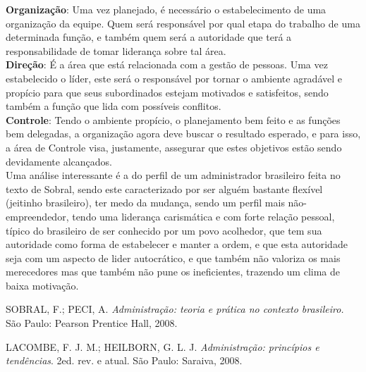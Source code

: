 \documentclass[14pt, oneside]{article}
\newcommand\tab[1][1cm]{\hspace*{#1}}
\theoremstyle{definition}
\begin{document}
                \tab \textbf{Organização}: Uma vez planejado, é necessário o estabelecimento de uma organização da equipe. Quem será responsável por qual etapa do trabalho de uma determinada função, e também quem será a autoridade que terá a responsabilidade de tomar liderança sobre tal área. \\
                \tab \textbf{Direção}: É a área que está relacionada com a gestão de pessoas. Uma vez estabelecido o líder, este será o responsável por tornar o ambiente agradável e propício para que seus subordinados estejam motivados e satisfeitos, sendo também a função que lida com possíveis conflitos. \\
                \tab \textbf{Controle}: Tendo o ambiente propício, o planejamento bem feito e as funções bem delegadas, a organização agora deve buscar o resultado esperado, e para isso, a área de Controle visa, justamente, assegurar que estes objetivos estão sendo devidamente alcançados. \\
                \tab Uma análise interessante é a do perfil de um administrador brasileiro feita no texto de Sobral, sendo este caracterizado por ser alguém bastante flexível (jeitinho brasileiro), ter medo da mudança, sendo um perfil mais não-empreendedor, tendo uma liderança carismática e com forte relação pessoal, típico do brasileiro de ser conhecido por um povo acolhedor, que tem sua autoridade como forma de estabelecer e manter a ordem, e que esta autoridade seja com um aspecto de lider autocrático, e que também não valoriza os mais merecedores mas que também não pune os ineficientes, trazendo um clima de baixa motivação.


        \begin{thebibliography}{9}
                SOBRAL, F.; PECI, A. 
            \textit{Administração: teoria e prática no contexto brasileiro.}
                São Paulo: Pearson Prentice Hall, 2008.
        
                LACOMBE, F. J. M.; HEILBORN, G. L. J. 
                \textit{Administração: princípios e tendências}. 
                2ed. rev. e atual. São Paulo: Saraiva, 2008.
         
        \end{thebibliography}


	        
\end{document}
